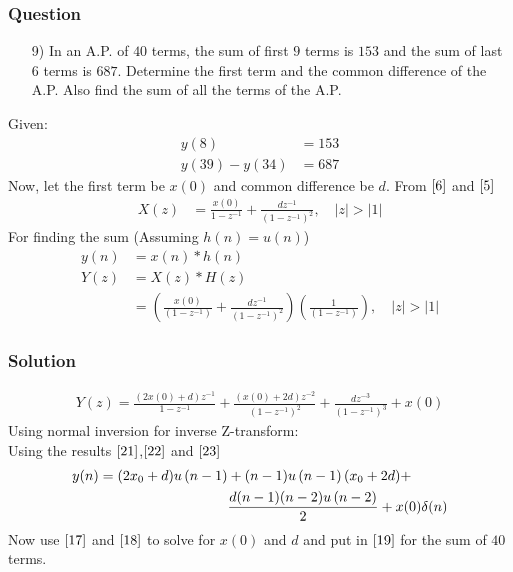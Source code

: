 \documentclass{beamer}
\providecommand{\brak}[1]{\ensuremath{\left(#1\right)}}
\theoremstyle{remark}
\providecommand{\abs}[1]{\left\vert#1\right\vert}
\begin{document}
\begin{frame}
\frametitle{Question }
\begin{enumerate}
    \item [9)]
In an A.P. of $40$ terms, the sum of first $9$ terms is $153$ and the sum of last $6$ terms is $687$. Determine the first term and the common difference of the A.P. Also find the sum of all the terms of the A.P. 
\end{enumerate}
\end{frame}
Given:
\begin{align}
y(8) &= 153 \label{17}\\
y(39)-y(34) &= 687 \label{18}
\end{align}
Now, let the first term be $x(0)$ and common difference be $d$. From $\eqref{6}$ and $\eqref{5}$
\begin{align}
    X(z) &= \frac{x(0)}{1-z^{-1}} + \frac{dz^{-1}}{\brak{1-z^{-1}}^2} ,\quad \abs {z}>\abs{1} 
\end{align}
For finding the sum (Assuming $h(n)=u\brak{n}$)
\begin{align}
    y\brak{n} &= x\brak{n} * h\brak{n}\\
Y\brak{z} &= X\brak{z} * H\brak{z}\\
&= \brak{\frac{x(0)}{\brak{1-z^{-1}}} +
\frac{dz^{-1}}{\brak{1-z^{-1}}^{2}}}\brak{\frac{1}{\brak{1-z^{-1}}}}
,\quad \abs {z}>\abs{1}     
\end{align}







\begin{frame}
\frametitle{Solution}
\begin{align}
 Y\brak{z}   = \frac{\brak{2x(0)+d}z^{-1}}{1-z^{-1}} + \frac{\brak{x(0)+2d}z^{-2}}{\brak{1-z^{-1}}^2} + \frac{dz^{-3}}{\brak{1-z^{-1}}^{3}} + x(0)
\end{align}
Using normal inversion for inverse Z-transform:\\
Using the results $\eqref{21}$,$\eqref{22}$ and $\eqref{23}$
\begin{align}
   y(n) = (2x_0+d)u\brak{n-1} &+ (n-1)u\brak{n-1}(x_0+2d) + \notag\\
    &\frac{d(n-1)(n-2)u\brak{n-2}}{2} + x(0)\delta(n)
\end{align}
Now use $\eqref{17}$ and $\eqref{18}$ to solve for $x(0)$ and $d$ and put in $\eqref{19}$ for the sum of $40$ terms.
\end{frame}
\end{document}
